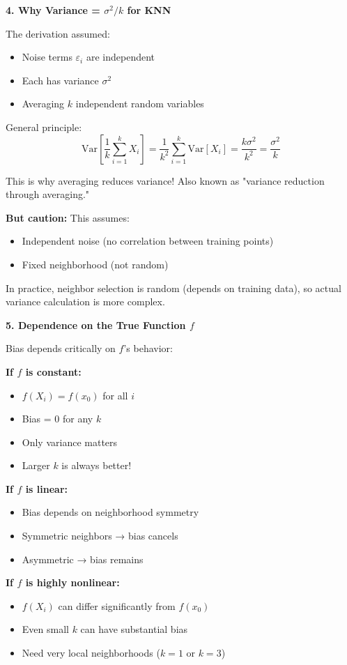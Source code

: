 \documentclass[12pt]{article}
\begin{document}
\begin{explanation}
\textbf{4. Why Variance = \(\sigma^2/k\) for KNN}

The derivation assumed:
\begin{itemize}
    \item Noise terms \(\varepsilon_i\) are independent
    \item Each has variance \(\sigma^2\)
    \item Averaging \(k\) independent random variables
\end{itemize}

General principle:
\[
\text{Var}\left[\frac{1}{k}\sum_{i=1}^k X_i\right] = \frac{1}{k^2} \sum_{i=1}^k \text{Var}[X_i] = \frac{k\sigma^2}{k^2} = \frac{\sigma^2}{k}
\]

This is why averaging reduces variance! Also known as "variance reduction through averaging."

\textbf{But caution:} This assumes:
\begin{itemize}
    \item Independent noise (no correlation between training points)
    \item Fixed neighborhood (not random)
\end{itemize}

In practice, neighbor selection is random (depends on training data), so actual variance calculation is more complex.

\textbf{5. Dependence on the True Function \(f\)}

Bias depends critically on \(f\)'s behavior:

\textbf{If \(f\) is constant:}
\begin{itemize}
    \item \(f(X_i) = f(x_0)\) for all \(i\)
    \item Bias = 0 for any \(k\)
    \item Only variance matters
    \item Larger \(k\) is always better!
\end{itemize}

\textbf{If \(f\) is linear:}
\begin{itemize}
    \item Bias depends on neighborhood symmetry
    \item Symmetric neighbors → bias cancels
    \item Asymmetric → bias remains
\end{itemize}

\textbf{If \(f\) is highly nonlinear:}
\begin{itemize}
    \item \(f(X_i)\) can differ significantly from \(f(x_0)\)
    \item Even small \(k\) can have substantial bias
    \item Need very local neighborhoods (\(k=1\) or \(k=3\))
\end{itemize}


\end{explanation}
\end{document}
